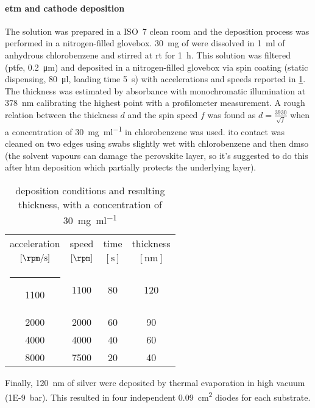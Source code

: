 		\paragraph{\Gls{etm} and cathode deposition}
		The solution was prepared in a ISO~7 clean room and the deposition process was performed in a nitrogen-filled glovebox. %
		\SI{30}{\mg} of  were dissolved in \SI{1}{\ml} of anhydrous chlorobenzene and stirred at \gls{rt} for \SI{1}{\hour}. This solution was filtered (\gls{ptfe}, \SI{0.2}{\um}) and deposited in a nitrogen-filled glovebox via spin coating (static dispensing, \SI{80}{\ul}, loading time \SI{5}{\s}) with accelerations and speeds reported in \cref{pcbm_thickness}. The thickness was estimated by absorbance with monochromatic illumination at \SI{378}{\nm} calibrating the highest point with a profilometer measurement. A rough relation between the thickness $d$ and the spin speed $f$ was found as $d = \frac{3930}{\sqrt{f}}$ when a concentration of \SI{30}{\mg\per\ml} in chlorobenzene was used.
		\Gls{ito} contact was cleaned on two edges using swabs slightly wet with chlorobenzene and then \gls{dmso} (the solvent vapours can damage the perovskite layer, so it's suggested to do this after \gls{htm} deposition which partially protects the underlying layer).
		\begin{table}%
			\caption{ deposition conditions and resulting thickness, with a concentration of \SI{30}{\mg\per\ml}}\label{pcbm_thickness}
			\begin{center}
				\begin{tabular}{c c c | c}
					acceleration        & speed         & time        & thickness    \\
					$[\si{\rpm\per\s}]$ & $[\si{\rpm}]$ & $[\si{\s}]$ & $[\si{\nm}]$ \\
					\hline
					\rule[0ex]{-4pt}{3ex}
					1100                & 1100          & 80          & 120          \\
					2000                & 2000          & 60          & 90           \\
					4000                & 4000          & 40          & 60           \\
					8000                & 7500          & 20          & 40           \\
				\end{tabular}
			\end{center}
		\end{table}
		Finally, \SI{120}{\nm} of silver were deposited by thermal evaporation in high vacuum (\SI{1E-9}{\bar}). This resulted in four independent \SI{0.09}{\cm\squared} diodes for each substrate.
		\label{methods_top_end}

